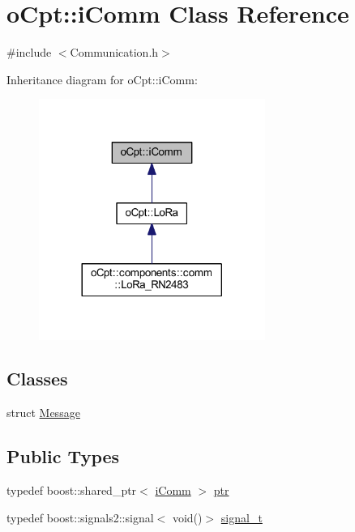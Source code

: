 \hypertarget{classo_cpt_1_1i_comm}{}\section{o\+Cpt\+:\+:i\+Comm Class Reference}
\label{classo_cpt_1_1i_comm}


{\ttfamily \#include $<$Communication.\+h$>$}



Inheritance diagram for o\+Cpt\+:\+:i\+Comm\+:\nopagebreak
\begin{figure}[H]
\begin{center}
\leavevmode
\includegraphics[width=209pt]{classo_cpt_1_1i_comm__inherit__graph}
\end{center}
\end{figure}
\subsection*{Classes}
\begin{DoxyCompactItemize}
\item 
struct \hyperlink{structo_cpt_1_1i_comm_1_1_message}{Message}
\end{DoxyCompactItemize}
\subsection*{Public Types}
\begin{DoxyCompactItemize}
\item 
typedef boost\+::shared\+\_\+ptr$<$ \hyperlink{classo_cpt_1_1i_comm}{i\+Comm} $>$ \hyperlink{classo_cpt_1_1i_comm_af0c655f143251b7d03fcd98f89637228}{ptr}
\item 
typedef boost\+::signals2\+::signal$<$ void()$>$ \hyperlink{classo_cpt_1_1i_comm_a8226eab43e254e986c1645cb1c500ef7}{signal\+\_\+t}
\end{DoxyCompactItemize}
